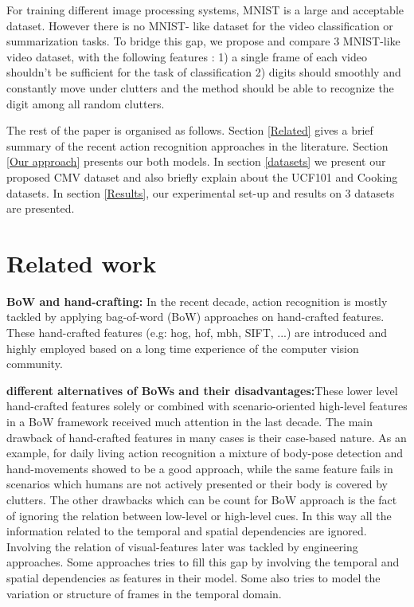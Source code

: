 \documentclass{article} %
\begin{document}
For training different image processing systems, MNIST is a large and acceptable dataset. However there is no MNIST- like dataset for the video classification or summarization tasks. To bridge this gap, we propose and compare 3 MNIST-like video dataset, with the following features : 1) a single frame of each video shouldn't be sufficient for the task of classification 2) digits should smoothly and constantly move under clutters and the method should be able to recognize the digit among all random clutters. 




The rest of the paper is organised as follows.
Section \ref{Related} gives a brief summary of the recent action recognition approaches in the literature. 
Section \ref{Our approach} presents our both models. In section \ref{datasets} we present our proposed CMV dataset and also briefly explain about the UCF101 and Cooking datasets. In section \ref{Results}, our experimental set-up and results on 3 datasets are presented.
\section{Related work}
\textbf{BoW and hand-crafting:} In the recent decade, action recognition is mostly tackled by applying bag-of-word (BoW) approaches on hand-crafted features. These hand-crafted features (e.g: hog, hof, mbh, SIFT, ...) are introduced and highly employed based on a long time experience of the computer vision community. 

\textbf{different alternatives of BoWs and their disadvantages:}These lower level hand-crafted features solely or combined with scenario-oriented high-level features in a BoW framework received much attention in the last decade. The main drawback of hand-crafted features in many cases is their case-based nature. As an example, for daily living action recognition a mixture of body-pose detection and hand-movements showed to be a good approach, while the same feature fails in scenarios which humans are not actively presented or their body is covered by clutters. The other drawbacks which can be count for BoW approach is the fact of ignoring the relation between low-level or high-level cues. In this way all the information related to the temporal and spatial dependencies are ignored. Involving the relation of visual-features later was tackled by engineering approaches. Some approaches tries to fill this gap by involving the temporal and spatial dependencies as features in their model. Some also tries to model the variation or structure of frames in the temporal domain. 
\end{document}
